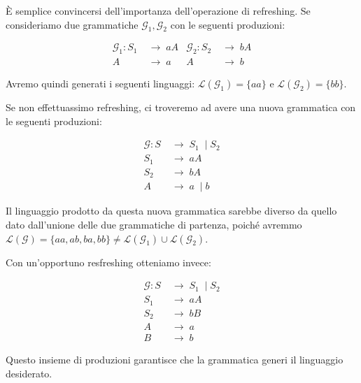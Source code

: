 \documentclass[class=book, crop=false, oneside, 12pt]{standalone}
\begin{document}
\begin{osservazione}
  È semplice convincersi dell'importanza dell'operazione di refreshing. Se consideriamo due grammatiche \(\mathcal{G}_1, \mathcal{G}_2\) con le seguenti produzioni:

  \begin{align*}
    \mathcal{G}_1: S_1\; &\to\; aA & \mathcal{G}_2: S_2\; &\to\; bA \\
    A\; &\to\; a & A\; &\to\; b
  \end{align*}

  \noindent Avremo quindi generati i seguenti linguaggi: \(\mathcal{L}(\mathcal{G}_1)  = \{aa\}\) e \(\mathcal{L}(\mathcal{G}_2)  = \{bb\}\).

  Se non effettuassimo refreshing, ci troveremo ad avere una nuova grammatica con le seguenti produzioni:

  \begin{align*}
    \mathcal{G}: S\; &\to\; S_1\; \mid S_2 \\
    S_1\; &\to\; aA \\
    S_2\; &\to\; bA \\
    A\; &\to\; a\; \mid b
  \end{align*}

  \noindent Il linguaggio prodotto da questa nuova grammatica sarebbe diverso da quello dato dall'unione delle due grammatiche di partenza, poiché avremmo \(\mathcal{L(G)} = \{aa, ab, ba, bb\} \neq \mathcal{L}(\mathcal{G}_1)  \cup \mathcal{L}(\mathcal{G}_2) \).

  Con un'opportuno resfreshing otteniamo invece:

  \begin{align*}
    \mathcal{G}: S\; &\to\; S_1\; \mid S_2 \\
    S_1\; &\to\; aA \\
    S_2\; &\to\; bB \\
    A\; &\to\; a \\
    B\; &\to\; b
  \end{align*}

  Questo insieme di produzioni garantisce che la grammatica generi il linguaggio desiderato.
\end{osservazione}
\end{document}
